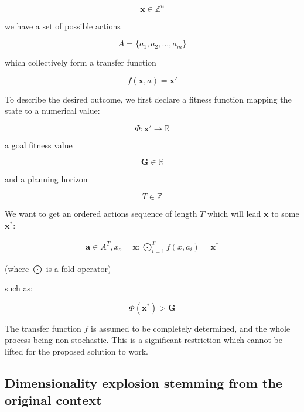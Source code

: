 \documentclass[12pt, a4paper]{article}
\begin{document}
	\begin{equation}
		\mathbf{x} \in \mathbb{Z}^n
	\end{equation}
	
	we have a set of possible actions
	
	\begin{equation}
		A = \{a_1, a_2,\ldots, a_m\}
	\end{equation}
	
	which collectively form a transfer function
	
	\begin{equation}\label{definitions:transfer-function}
		f(\mathbf{x}, a) = \mathbf{x}'
	\end{equation}

	To describe the desired outcome, we first declare a fitness function mapping the state to a numerical value:
	
	\begin{equation}
		\Phi : \mathbf{x}' \rightarrow \mathbb{R}
	\end{equation} 
	
	a goal fitness value 
	
	\begin{equation}
		\mathbf{G} \in \mathbb{R}
	\end{equation}
	
	and a planning horizon
	
	\begin{equation}
		T \in \mathbb{Z}
	\end{equation}
	
	We want to get an ordered actions sequence of length $T$ which will lead $\mathbf{x}$ to some $\mathbf{x}^*$:
	
	\begin{eqnarray}\label{definitions:fold}
		\mathbf{a} \in A^T, x_o = \mathbf{x}: \bigodot_{i=1}^{T} f(x, a_i) = \mathbf{x}^*
	\end{eqnarray}
	
	(where $\bigodot$ is a fold operator)
	
	such as:
	
	\begin{equation}
		\Phi(\mathbf{x}^*) > \mathbf{G}
	\end{equation}
	
	The transfer function $f$ is assumed to be completely determined, and the whole process being non-stochastic. This is a significant restriction which cannot be lifted for the proposed solution to work.

	\subsection{Dimensionality explosion stemming from the original context}
\end{document}
